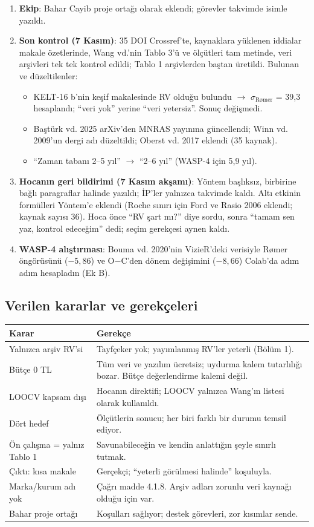 \documentclass[11pt,a4paper]{article}
\newcounter{sor}[section]
\newcommand{\OC}{O$-$C}
\newcommand{\sR}{\ensuremath{\sigma_{\text{Rømer}}}}
\begin{document}
\begin{enumerate}
\item \textbf{Ekip}: Bahar Cayib proje ortağı olarak eklendi; görevler takvimde isimle yazıldı.
\item \textbf{Son kontrol (7 Kasım)}: 35 DOI Crossref'te, kaynaklara yüklenen iddialar makale özetlerinde, Wang vd.'nin Tablo 3'ü ve ölçütleri tam metinde, veri arşivleri tek tek kontrol edildi; Tablo 1 arşivlerden baştan üretildi. Bulunan ve düzeltilenler:
  \begin{itemize}
  \item KELT-16 b'nin keşif makalesinde RV olduğu bulundu $\rightarrow$ \sR{} = 39,3 hesaplandı; ``veri yok'' yerine ``veri yetersiz''. Sonuç değişmedi.
  \item Baştürk vd. 2025 arXiv'den MNRAS yayınına güncellendi; Winn vd. 2009'un dergi adı düzeltildi; Oberst vd. 2017 eklendi (35 kaynak).
  \item ``Zaman tabanı 2--5 yıl'' $\rightarrow$ ``2--6 yıl'' (WASP-4 için 5,9 yıl).
  \end{itemize}
\item \textbf{Hocanın geri bildirimi (7 Kasım akşamı)}: Yöntem başlıksız, birbirine bağlı paragraflar halinde yazıldı; İP'ler yalnızca takvimde kaldı. Altı etkinin formülleri Yöntem'e eklendi (Roche sınırı için Ford ve Rasio 2006 eklendi; kaynak sayısı 36). Hoca önce ``RV şart mı?'' diye sordu, sonra ``tamam sen yaz, kontrol edeceğim'' dedi; seçim gerekçesi aynen kaldı.
\item \textbf{WASP-4 alıştırması}: Bouma vd. 2020'nin VizieR'deki verisiyle Rømer öngörüsünü ($-5{,}86$) ve \OC{}'den dönem değişimini ($-8{,}66$) Colab'da adım adım hesapladın (Ek B).
\end{enumerate}

\subsection{Verilen kararlar ve gerekçeleri}
\begin{longtable}{@{}p{4.2cm}p{11.5cm}@{}}
\toprule
Karar & Gerekçe \\ \midrule\endhead
Yalnızca arşiv RV'si & Tayfçeker yok; yayımlanmış RV'ler yeterli (Bölüm 1). \\
Bütçe 0 TL & Tüm veri ve yazılım ücretsiz; uydurma kalem tutarlılığı bozar. Bütçe değerlendirme kalemi değil. \\
LOOCV kapsam dışı & Hocanın direktifi; LOOCV yalnızca Wang'ın listesi olarak kullanıldı. \\
Dört hedef & Ölçütlerin sonucu; her biri farklı bir durumu temsil ediyor. \\
Ön çalışma = yalnız Tablo 1 & Savunabileceğin ve kendin anlattığın şeyle sınırlı tutmak. \\
Çıktı: kısa makale & Gerçekçi; ``yeterli görülmesi halinde'' koşuluyla. \\
Marka/kurum adı yok & Çağrı madde 4.1.8. Arşiv adları zorunlu veri kaynağı olduğu için var. \\
Bahar proje ortağı & Koşulları sağlıyor; destek görevleri, zor kısımlar sende. \\ \bottomrule
\end{longtable}
\end{document}
